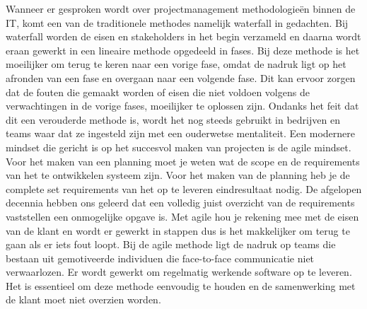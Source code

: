 \documentclass{hogent-article}
\begin{document}
   Wanneer er gesproken wordt over projectmanagement methodologieën binnen de IT, komt een van de traditionele methodes namelijk waterfall in gedachten. Bij waterfall worden de eisen en stakeholders in het begin verzameld en daarna wordt eraan gewerkt in een lineaire methode opgedeeld in fases. Bij deze methode is het moeilijker om terug te keren naar een vorige fase, omdat de nadruk ligt op het afronden van een fase en overgaan naar een volgende fase. Dit kan ervoor zorgen dat de fouten die gemaakt worden of eisen die niet voldoen volgens de verwachtingen in de vorige fases, moeilijker te oplossen zijn. Ondanks het feit dat dit een verouderde methode is, wordt het nog steeds gebruikt in bedrijven en teams waar dat ze ingesteld zijn met een ouderwetse mentaliteit. 
   Een modernere mindset die gericht is op het succesvol maken van projecten is de agile mindset. Voor het maken van een planning moet je weten wat de scope en de requirements van het te ontwikkelen systeem zijn. Voor het maken van de planning heb je de complete set requirements van het op te leveren eindresultaat nodig. De afgelopen decennia hebben ons geleerd dat een volledig juist overzicht van de requirements vaststellen een onmogelijke opgave is. Met agile hou je rekening mee met de eisen van de klant en wordt er gewerkt in stappen dus is het makkelijker om terug te gaan als er iets fout loopt. Bij de agile methode ligt de nadruk op teams die bestaan uit gemotiveerde individuen die face-to-face communicatie niet verwaarlozen. Er wordt gewerkt om regelmatig werkende software op te leveren. Het is essentieel om deze methode eenvoudig te houden en de samenwerking met de klant moet niet overzien worden. 
\end{document}
